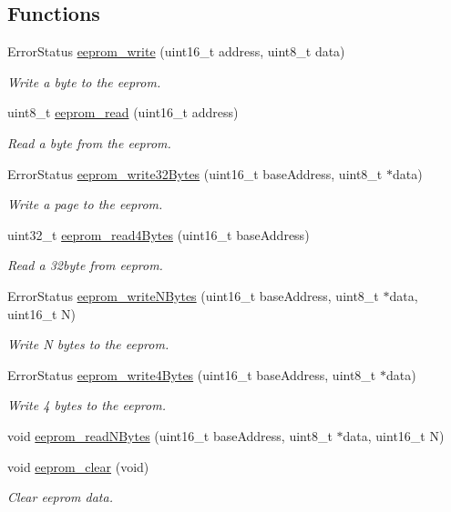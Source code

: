 \subsection*{Functions}
\begin{DoxyCompactItemize}
\item 
Error\+Status \hyperlink{group___eeprom___trans_ga46c7b6081a89f96d53b6ebc0d0b6f60b}{eeprom\+\_\+write} (uint16\+\_\+t address, uint8\+\_\+t data)
\begin{DoxyCompactList}\small\item\em Write a byte to the eeprom. \end{DoxyCompactList}\item 
uint8\+\_\+t \hyperlink{group___eeprom___trans_gafaa7cca6f6ad1d9ae49522324c825c2f}{eeprom\+\_\+read} (uint16\+\_\+t address)
\begin{DoxyCompactList}\small\item\em Read a byte from the eeprom. \end{DoxyCompactList}\item 
Error\+Status \hyperlink{group___eeprom___trans_ga8c4d6169df1fdb9baeca667b5e9b0058}{eeprom\+\_\+write32\+Bytes} (uint16\+\_\+t base\+Address, uint8\+\_\+t $\ast$data)
\begin{DoxyCompactList}\small\item\em Write a page to the eeprom. \end{DoxyCompactList}\item 
uint32\+\_\+t \hyperlink{group___eeprom___trans_ga9a323370ddd02d91c6118f104c015b43}{eeprom\+\_\+read4\+Bytes} (uint16\+\_\+t base\+Address)
\begin{DoxyCompactList}\small\item\em Read a 32byte from eeprom. \end{DoxyCompactList}\item 
Error\+Status \hyperlink{group___eeprom___trans_ga9dea9d824339ffc184a047749533b96d}{eeprom\+\_\+write\+N\+Bytes} (uint16\+\_\+t base\+Address, uint8\+\_\+t $\ast$data, uint16\+\_\+t N)
\begin{DoxyCompactList}\small\item\em Write N bytes to the eeprom. \end{DoxyCompactList}\item 
Error\+Status \hyperlink{group___eeprom___trans_ga7d9db4a4822fa0c3e5b811615aaed569}{eeprom\+\_\+write4\+Bytes} (uint16\+\_\+t base\+Address, uint8\+\_\+t $\ast$data)
\begin{DoxyCompactList}\small\item\em Write 4 bytes to the eeprom. \end{DoxyCompactList}\item 
void \hyperlink{group___eeprom___trans_gab7c6abb0e0c39a8c152307fb822ffa0c}{eeprom\+\_\+read\+N\+Bytes} (uint16\+\_\+t base\+Address, uint8\+\_\+t $\ast$data, uint16\+\_\+t N)
\item 
void \hyperlink{group___eeprom___trans_ga7964a5a66da1c4a59a42309a93752217}{eeprom\+\_\+clear} (void)
\begin{DoxyCompactList}\small\item\em Clear eeprom data. \end{DoxyCompactList}\end{DoxyCompactItemize}


